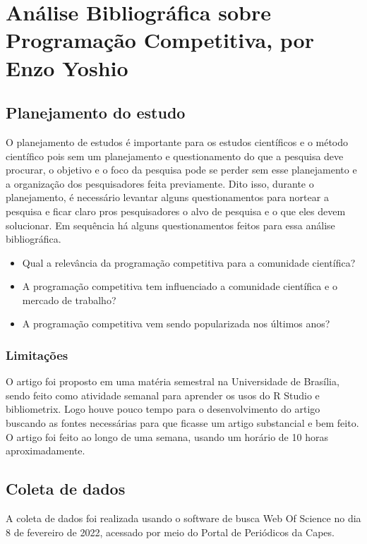 \chapter{Análise Bibliográfica sobre Programação Competitiva, por Enzo Yoshio}

\section{Planejamento do estudo}

    O planejamento de estudos é importante para os estudos científicos e o método científico pois sem um planejamento e questionamento do que a pesquisa deve procurar, o objetivo e o foco da pesquisa pode se perder sem esse planejamento e a organização dos pesquisadores feita previamente. Dito isso, durante o planejamento, é necessário levantar alguns questionamentos para nortear a pesquisa e ficar claro pros pesquisadores o alvo de pesquisa e o que eles devem solucionar. Em sequência há alguns questionamentos feitos para essa análise bibliográfica.
 

\begin{itemize}
    \item Qual a relevância da programação competitiva para a comunidade científica? 
    \item A programação competitiva tem influenciado a comunidade científica e o mercado de trabalho?
    \item A programação competitiva vem sendo popularizada nos últimos anos?
\end{itemize}

\subsection{Limitações} O artigo foi proposto em uma matéria semestral na Universidade de Brasília, sendo feito como atividade semanal para aprender os usos do R Studio e bibliometrix. Logo houve pouco tempo para o desenvolvimento do artigo buscando as fontes necessárias para que ficasse um artigo substancial e bem feito. O artigo foi feito ao longo de uma semana, usando um horário de 10 horas aproximadamente.

\section{Coleta de dados}

A coleta de dados foi realizada usando o software de busca Web Of Science no dia 8 de fevereiro de 2022, acessado por meio do Portal de Periódicos da Capes.

